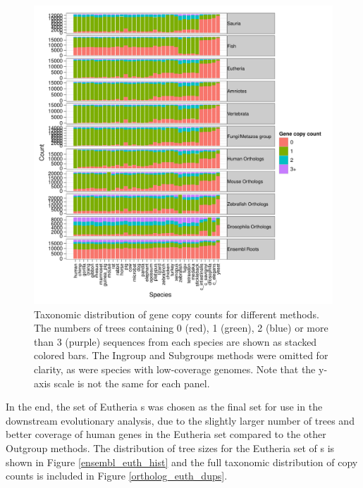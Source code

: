 \begin{figure}
\centering
\includegraphics[scale=0.8]{Figs/ortholog_stacked_bar.pdf}
\caption{Taxonomic distribution of gene copy counts for different
  \subtr methods. The numbers of trees containing 0 (red), 1 (green),
  2 (blue) or more than 3 (purple) sequences from each species are
  shown as stacked colored bars. The Ingroup and Subgroups methods
  were omitted for clarity, as were species with low-coverage
  genomes. Note that the y-axis scale is not the same for each panel.}
\label{ortholog_stacked_bar}
\end{figure}

In the end, the set of Eutheria \subtr{}s was chosen as the final set
for use in the downstream evolutionary analysis, due to the slightly
larger number of trees and better coverage of human genes in the
Eutheria set compared to the other Outgroup methods. The distribution
of tree sizes for the Eutheria set of \subtr{}s is shown in Figure
\ref{ensembl_euth_hist} and the full taxonomic distribution of copy
counts is included in Figure \ref{ortholog_euth_dups}.

